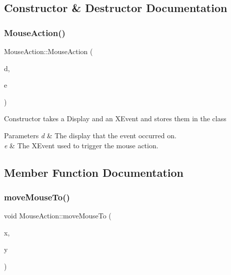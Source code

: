 \subsection{Constructor \& Destructor Documentation}
\mbox{\label{classMouseAction_a42e540b994144f3f8775baded5370b14}} 
\subsubsection{\texorpdfstring{Mouse\+Action()}{MouseAction()}}
{\footnotesize\ttfamily Mouse\+Action\+::\+Mouse\+Action (\begin{DoxyParamCaption}\item[{Display $\ast$}]{d,  }\item[{X\+Event}]{e }\end{DoxyParamCaption})}

Constructor takes a Display and an X\+Event and stores them in the class


\begin{DoxyParams}{Parameters}
{\em d} & The display that the event occurred on. \\
\hline
{\em e} & The X\+Event used to trigger the mouse action. \\
\hline
\end{DoxyParams}


\subsection{Member Function Documentation}
\mbox{\label{classMouseAction_a7a14cab01ad2ccdb1b135d4bae939fe2}} 
\subsubsection{\texorpdfstring{move\+Mouse\+To()}{moveMouseTo()}}
{\footnotesize\ttfamily void Mouse\+Action\+::move\+Mouse\+To (\begin{DoxyParamCaption}\item[{int}]{x,  }\item[{int}]{y }\end{DoxyParamCaption})}

